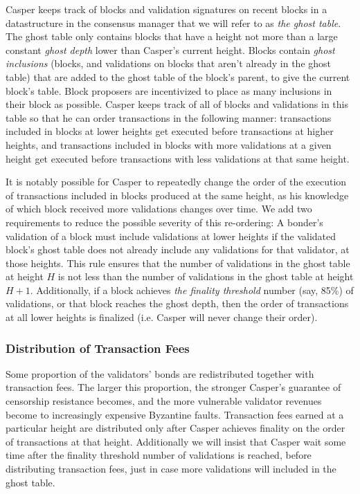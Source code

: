 \documentclass[11pt,a4paper]{article}
\begin{document}
Casper keeps track of blocks and validation signatures on recent blocks in a datastructure in the consensus manager that we will refer to as \emph{the ghost table}. The ghost table only contains blocks that have a height not more than a large constant \emph{ghost depth} lower than Casper's current height. Blocks contain \emph{ghost inclusions} (blocks, and validations on blocks that aren't already in the ghost table) that are added to the ghost table of the block's parent, to give the current block's table. Block proposers are incentivized to place as many inclusions in their block as possible. Casper keeps track of all of blocks and validations in this table so that he can order transactions in the following manner: transactions included in blocks at lower heights get executed before transactions at higher heights, and transactions included in blocks with more validations at a given height get executed before transactions with less validations at that same height.

It is notably possible for Casper to repeatedly change the order of the execution of transactions included in blocks produced at the same height, as his knowledge of which block received more validations changes over time. We add two requirements to reduce the possible severity of this re-ordering: A bonder's validation of a block must include validations at lower heights if the validated block's ghost table does not already include any validations for that validator, at those heights. This rule ensures that the number of validations in the ghost table at height $H$ is not less than the number of validations in the ghost table at height $H + 1$. Additionally, if a block achieves \emph{the finality threshold} number (say, 85\%) of validations, or that block reaches the ghost depth, then the order of transactions at all lower heights is finalized (i.e. Casper will never change their order).


\subsubsection{Distribution of Transaction Fees}

Some proportion of the validators' bonds are redistributed together with transaction fees. The larger this proportion, the stronger Casper's guarantee of censorship resistance becomes, and the more vulnerable validator revenues become to increasingly expensive Byzantine faults. Transaction fees earned at a particular height are distributed only after Casper achieves finality on the order of transactions at that height. Additionally we will insist that Casper wait some time after the finality threshold number of validations is reached, before distributing transaction fees, just in case more validations will included in the ghost table.
\end{document}
